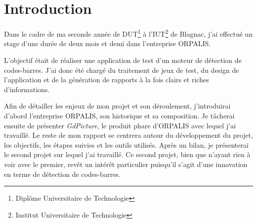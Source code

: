 \chapter*{Introduction}

Dans le cadre de ma seconde année de DUT\footnote{Diplôme Universitaire de Technologie} à l'IUT\footnote{Institut Universitaire de Technologie} de Blagnac, j'ai effectué un stage d'une durée de deux mois et demi dans l'entreprise ORPALIS.

L'objectif était de réaliser une application de test d'un moteur de détection de codes-barres. J'ai donc été chargé du traitement de jeux de test, du design de l'application et de la génération de rapports à la fois clairs et riches d'informations.

Afin de détailler les enjeux de mon projet et son déroulement, j'introduirai d'abord l'entreprise ORPALIS, son historique et sa composition. Je tâcherai ensuite de présenter \emph{GdPicture}, le produit phare d'ORPALIS avec lequel j'ai travaillé. Le reste de mon rapport se centrera autour du développement du projet, les objectifs, les étapes suivies et les outils utilisés. Après un bilan, je présenterai le second projet sur lequel j'ai travaillé. Ce second projet, bien que n'ayant rien à voir avec le premier, revêt un intérêt particulier puisqu'il s'agit d'une innovation en terme de détection de codes-barres.